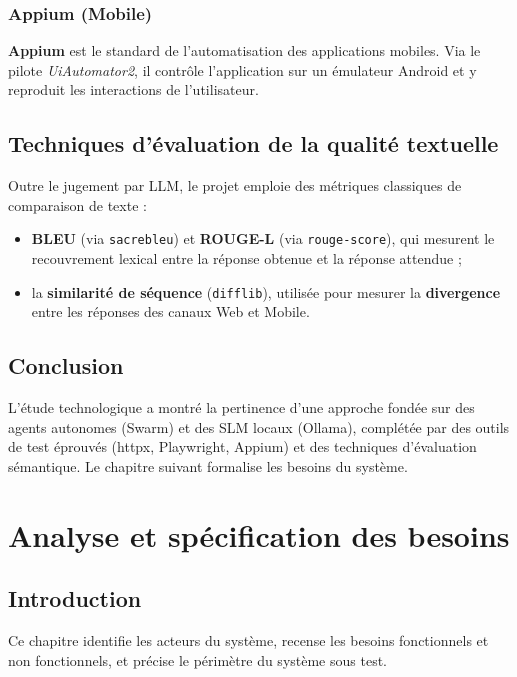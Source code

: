 \documentclass[12pt,a4paper,oneside]{report}
\begin{document}
\subsection{Appium (Mobile)}
\textbf{Appium} est le standard de l'automatisation des applications mobiles. Via le
pilote \textit{UiAutomator2}, il contrôle l'application sur un émulateur Android et y
reproduit les interactions de l'utilisateur.

\section{Techniques d'évaluation de la qualité textuelle}
Outre le jugement par LLM, le projet emploie des métriques classiques de comparaison
de texte :
\begin{itemize}[leftmargin=*]
  \item \textbf{BLEU} (via \texttt{sacrebleu}) et \textbf{ROUGE-L} (via
  \texttt{rouge-score}), qui mesurent le recouvrement lexical entre la réponse obtenue
  et la réponse attendue ;
  \item la \textbf{similarité de séquence} (\texttt{difflib}), utilisée pour mesurer la
  \textbf{divergence} entre les réponses des canaux Web et Mobile.
\end{itemize}

\section{Conclusion}
L'étude technologique a montré la pertinence d'une approche fondée sur des agents
autonomes (Swarm) et des SLM locaux (Ollama), complétée par des outils de test
éprouvés (httpx, Playwright, Appium) et des techniques d'évaluation sémantique. Le
chapitre suivant formalise les besoins du système.

\chapter{Analyse et spécification des besoins}

\section{Introduction}
Ce chapitre identifie les acteurs du système, recense les besoins fonctionnels et non
fonctionnels, et précise le périmètre du système sous test.
\end{document}
